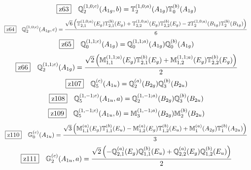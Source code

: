 \documentclass[fleqn,10pt,landscape]{jsarticle}
\begin{document}
\begin{dmath*}
\hspace*{3mm}\fbox{z63}\quad \mathbb{Q}_{2}^{(1,0;c)}(A_{1g},b)=\mathbb{T}_{2}^{(1,0;a)}(A_{1g}) \mathbb{T}_{0}^{(b)}(A_{1g})
\end{dmath*}
\begin{dmath*}
\hspace*{3mm}\fbox{z64}\quad \mathbb{Q}_{2}^{(1,0;c)}(A_{1g},c)=\frac{\sqrt{6} \left(\mathbb{T}_{2,1}^{(1,0;a)}(E_{g}) \mathbb{T}_{2,1}^{(b)}(E_{g}) + \mathbb{T}_{2,2}^{(1,0;a)}(E_{g}) \mathbb{T}_{2,2}^{(b)}(E_{g}) - 2 \mathbb{T}_{2}^{(1,0;a)}(B_{1g}) \mathbb{T}_{2}^{(b)}(B_{1g})\right)}{6}
\end{dmath*}
\begin{dmath*}
\hspace*{3mm}\fbox{z65}\quad \mathbb{Q}_{0}^{(1,1;c)}(A_{1g})=\mathbb{Q}_{0}^{(1,1;a)}(A_{1g}) \mathbb{Q}_{0}^{(b)}(A_{1g})
\end{dmath*}
\begin{dmath*}
\hspace*{3mm}\fbox{z66}\quad \mathbb{Q}_{2}^{(1,1;c)}(A_{1g})=\frac{\sqrt{2} \left(\mathbb{M}_{1,1}^{(1,1;a)}(E_{g}) \mathbb{T}_{2,1}^{(b)}(E_{g}) + \mathbb{M}_{1,2}^{(1,1;a)}(E_{g}) \mathbb{T}_{2,2}^{(b)}(E_{g})\right)}{2}
\end{dmath*}
\begin{dmath*}
\hspace*{3mm}\fbox{z107}\quad \mathbb{Q}_{5}^{(c)}(A_{1u})=\mathbb{Q}_{2}^{(a)}(B_{2g}) \mathbb{Q}_{3}^{(b)}(B_{2u})
\end{dmath*}
\begin{dmath*}
\hspace*{3mm}\fbox{z108}\quad \mathbb{Q}_{5}^{(1,-1;c)}(A_{1u},a)=\mathbb{Q}_{2}^{(1,-1;a)}(B_{2g}) \mathbb{Q}_{3}^{(b)}(B_{2u})
\end{dmath*}
\begin{dmath*}
\hspace*{3mm}\fbox{z109}\quad \mathbb{Q}_{5}^{(1,-1;c)}(A_{1u},b)=\mathbb{M}_{3}^{(1,-1;a)}(B_{2g}) \mathbb{M}_{2}^{(b)}(B_{2u})
\end{dmath*}
\begin{dmath*}
\hspace*{3mm}\fbox{z110}\quad \mathbb{G}_{0}^{(c)}(A_{1u})=\frac{\sqrt{3} \left(\mathbb{M}_{1,1}^{(a)}(E_{g}) \mathbb{T}_{1,1}^{(b)}(E_{u}) - \mathbb{M}_{1,2}^{(a)}(E_{g}) \mathbb{T}_{1,2}^{(b)}(E_{u}) + \mathbb{M}_{1}^{(a)}(A_{2g}) \mathbb{T}_{1}^{(b)}(A_{2u})\right)}{3}
\end{dmath*}
\begin{dmath*}
\hspace*{3mm}\fbox{z111}\quad \mathbb{G}_{2}^{(c)}(A_{1u},a)=\frac{\sqrt{2} \left(- \mathbb{Q}_{2,1}^{(a)}(E_{g}) \mathbb{Q}_{1,1}^{(b)}(E_{u}) + \mathbb{Q}_{2,2}^{(a)}(E_{g}) \mathbb{Q}_{1,2}^{(b)}(E_{u})\right)}{2}
\end{dmath*}
\end{document}
